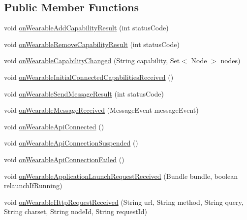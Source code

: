 \subsection*{Public Member Functions}
\begin{DoxyCompactItemize}
\item 
void \hyperlink{interfacecom_1_1google_1_1devrel_1_1wcl_1_1callbacks_1_1WearConsumer_a87f6e50e4a86c5a931e8ffee025deea2}{on\+Wearable\+Add\+Capability\+Result} (int status\+Code)
\item 
void \hyperlink{interfacecom_1_1google_1_1devrel_1_1wcl_1_1callbacks_1_1WearConsumer_a7dd2a5c97d7fc8b489258c911523fa72}{on\+Wearable\+Remove\+Capability\+Result} (int status\+Code)
\item 
void \hyperlink{interfacecom_1_1google_1_1devrel_1_1wcl_1_1callbacks_1_1WearConsumer_a01ca74cab966f7b000a6acce026d7b86}{on\+Wearable\+Capability\+Changed} (String capability, Set$<$ Node $>$ nodes)
\item 
void \hyperlink{interfacecom_1_1google_1_1devrel_1_1wcl_1_1callbacks_1_1WearConsumer_a767af54293eda1e2a66459c05c48f554}{on\+Wearable\+Initial\+Connected\+Capabilities\+Received} ()
\item 
void \hyperlink{interfacecom_1_1google_1_1devrel_1_1wcl_1_1callbacks_1_1WearConsumer_a7de9151e0c9d78734ddf2fab0a0bc6c8}{on\+Wearable\+Send\+Message\+Result} (int status\+Code)
\item 
void \hyperlink{interfacecom_1_1google_1_1devrel_1_1wcl_1_1callbacks_1_1WearConsumer_a2b91f7080cad43d053d6e942c521e943}{on\+Wearable\+Message\+Received} (Message\+Event message\+Event)
\item 
void \hyperlink{interfacecom_1_1google_1_1devrel_1_1wcl_1_1callbacks_1_1WearConsumer_a69a456c1730b9b26fc9e651e03056248}{on\+Wearable\+Api\+Connected} ()
\item 
void \hyperlink{interfacecom_1_1google_1_1devrel_1_1wcl_1_1callbacks_1_1WearConsumer_ae3fa58c5cfc736550a60f799e1174394}{on\+Wearable\+Api\+Connection\+Suspended} ()
\item 
void \hyperlink{interfacecom_1_1google_1_1devrel_1_1wcl_1_1callbacks_1_1WearConsumer_a4dc69bcb5554589c91c70683b75243fe}{on\+Wearable\+Api\+Connection\+Failed} ()
\item 
void \hyperlink{interfacecom_1_1google_1_1devrel_1_1wcl_1_1callbacks_1_1WearConsumer_a0facaeb65075a01fdd4c7e1049d53cf9}{on\+Wearable\+Application\+Launch\+Request\+Received} (Bundle bundle, boolean relaunch\+If\+Running)
\item 
void \hyperlink{interfacecom_1_1google_1_1devrel_1_1wcl_1_1callbacks_1_1WearConsumer_abcee1bca516c72b0541eb9c2b775ac07}{on\+Wearable\+Http\+Request\+Received} (String url, String method, String query, String charset, String node\+Id, String request\+Id)

\end{DoxyCompactItemize}

